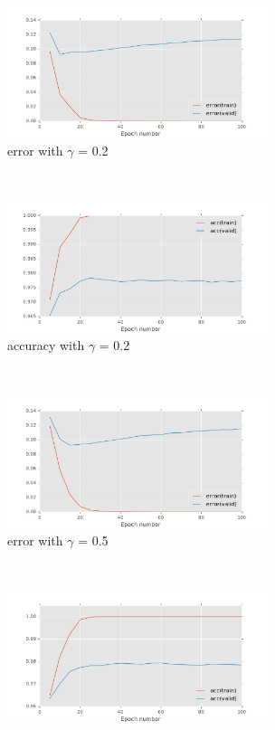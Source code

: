 \documentclass[11pt]{article}
\begin{document}
\begin{figure}[t!]
    \centering
    \begin{subfigure}[t]{0.45\textwidth}
        \centering
        \includegraphics[height=1.5in]{error_with_gamma_0_2.pdf}
        \caption{error with $\gamma$ = 0.2}
    \end{subfigure}   
    ~
    \begin{subfigure}[t]{0.45\textwidth}
        \centering
        \includegraphics[height=1.5in]{acc_with_gamma_0_2.pdf}
        \caption{accuracy with $\gamma$ = 0.2}
    \end{subfigure}
    ~ 
    \begin{subfigure}[t]{0.45\textwidth}
        \centering
        \includegraphics[height=1.5in]{error_with_gamma_0_5.pdf}
        \caption{error with $\gamma$ = 0.5}
    \end{subfigure}   
    ~
    \begin{subfigure}[t]{0.45\textwidth}
        \centering
        \includegraphics[height=1.5in]{acc_with_gamma_0_5.pdf}

\end{subfigure}
\end{figure}
\end{document}
